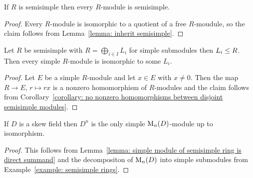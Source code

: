 \begin{proposition}
  If $R$ is semisimple then every $R$-module is semisimple.
\end{proposition}


\begin{proof}
  Every $R$-module is isomorphic to a quotient of a free $R$-moudule, so the claim follows from Lemma~\ref{lemma: inherit semisimple}.
\end{proof}


\begin{lemma}
  \label{lemma: simple module of semisimple ring is direct summand}
  Let $R$ be semisimple with $R = \bigoplus_{i \in I} L_i$ for simple submodules then $L_i \leq R$.
  Then every simple $R$-module is isomorphic to some $L_i$.
\end{lemma}


\begin{proof}
  Let $E$ be a simple $R$-module and let $x \in E$ with $x \neq 0$.
  Then the map $R \to E$, $r \mapsto rx$ is a nonzero homomorphism of $R$-modules and the claim follows from Corollary~\ref{corollary: no nonzero homomorphisms between disjoint semisimple modules}.
\end{proof}




\begin{corollary}
  \label{corollary: D^n is the only simple M_n(D)-module}
  If $D$ is a skew field then $D^n$ is the only simple $\operatorname{M}_n(D)$-module up to isomorphism.
\end{corollary}


\begin{proof}
  This follows from Lemma~\ref{lemma: simple module of semisimple ring is direct summand} and the decompositon of $\operatorname{M}_n(D)$ into simple submodules from Example~\ref{example: semisimple rings}.
\end{proof}


